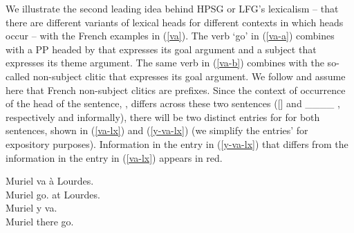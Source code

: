 \documentclass[output=paper
                ,modfonts
                ,nonflat
	        ,collection
	        ,collectionchapter
	        ,collectiontoclongg
 	        ,biblatex
                ,babelshorthands
                ,newtxmath
                ,draftmode
                ,colorlinks, citecolor=brown
]{./langsci/langscibook}
\begin{document}
{We illustrate the second leading idea behind HPSG or LFG's lexicalism  -- that there are different variants of lexical heads for different contexts in which heads occur -- with the French examples in (\ref{va}).  The verb  `go' in (\ref{va-a}) combines with a PP headed by  that expresses its goal argument and a subject that expresses its theme argument. The same verb in (\ref{va-b}) combines with the so-called non-subject clitic  that expresses its goal argument. We follow \citet{MillerandSag1997} and assume here that French non-subject clitics are prefixes. Since the context of occurrence of the head of the sentence, , differs across these two sentences ([] and  \_\_\_\_ , respectively and informally), there will be two distinct entries for  for both sentences, shown in (\ref{va-lx}) and (\ref{y-va-lx}) (we simplify the entries'  for expository purposes). Information in the entry in (\ref{y-va-lx}) that differs from the information in the entry in (\ref{va-lx}) appears in red.

\begin{exe}
	\ex\label{va}
	\begin{xlist}
		\ex\label{va-a} \gll Muriel va à Lourdes. \\
		Muriel go. at Lourdes. \\
		\ex\label{va-b} \gll Muriel y va. \\
		Muriel there go. \\
	\end{xlist}	
\end{exe}

\ea
\label{va-lx}
\z

}
\end{document}
